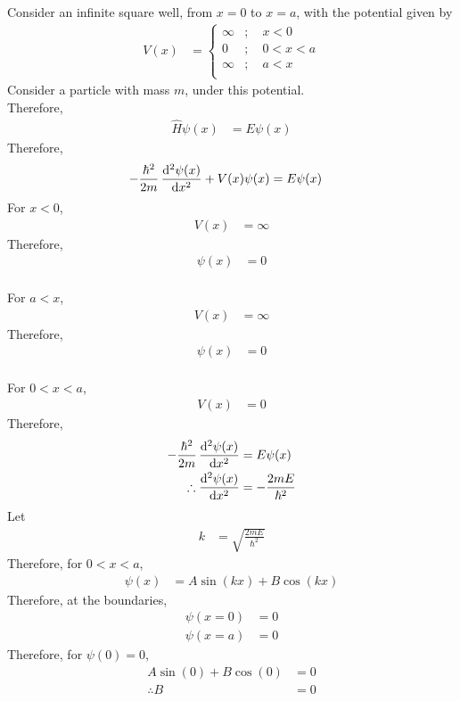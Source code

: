 \documentclass[titlepage, fleqn, a4paper, 12pt, twoside]{article}
\theoremstyle{definition}
\theoremstyle{theorem}
\begin{document}
Consider an infinite square well, from $x = 0$ to $x = a$, with the potential given by
\begin{align*}
	V(x) &=
	\begin{cases}
		\infty &;\quad x < 0\\
		0 &;\quad 0 < x < a\\
		\infty &;\quad a < x\\
	\end{cases}
\end{align*}
Consider a particle with mass $m$, under this potential.\\
Therefore,
\begin{align*}
	\hat{H} \psi(x) &= E \psi(x)
\end{align*}
Therefore,
\begin{align*}
	-\frac{\hbar^2}{2 m} \dod[2]{\psi(x)}{x} + V(x) \psi(x) &= E \psi(x)
\end{align*}
For $x < 0$,
\begin{align*}
	V(x) &= \infty
\end{align*}
Therefore,
\begin{align*}
	\psi(x) &= 0
\end{align*}
~\\
For $a < x$,
\begin{align*}
	V(x) &= \infty
\end{align*}
Therefore,
\begin{align*}
	\psi(x) &= 0
\end{align*}
~\\
For $0 < x < a$,
\begin{align*}
	V(x) &= 0
\end{align*}
Therefore,
\begin{align*}
	-\frac{\hbar^2}{2 m} \dod[2]{\psi(x)}{x} &= E \psi(x)\\
	\therefore \dod[2]{\psi(x)}{x} &= -\frac{2 m E}{\hbar^2}
\end{align*}
Let
\begin{align*}
	k &= \sqrt{\frac{2 m E}{\hbar^2}}
\end{align*}
Therefore, for $0 < x < a$,
\begin{align*}
	\psi(x) &= A \sin(k x) + B \cos(k x)
\end{align*}
Therefore, at the boundaries,
\begin{align*}
	\psi(x = 0) &= 0\\
	\psi(x = a) &= 0
\end{align*}
Therefore, for $\psi(0) = 0$,
\begin{align*}
	A \sin(0) + B \cos(0) &= 0\\
	\therefore B &= 0
\end{align*}
\end{document}
